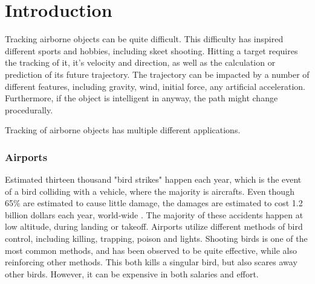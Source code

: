 
\chapter{Introduction}

Tracking airborne objects can be quite difficult.
This difficulty has inspired different sports and hobbies, including skeet shooting.
Hitting a target requires the tracking of it, it's velocity and direction, as well as the calculation or prediction of its future trajectory.
The trajectory can be impacted by a number of different features, including gravity, wind, initial force, any artificial acceleration.
Furthermore, if the object is intelligent in anyway, the path might change procedurally.


Tracking of airborne objects has multiple different applications.

\subsection{Airports}
Estimated thirteen thousand "bird strikes" happen each year, which is the event of a bird colliding with a vehicle, where the majority is aircrafts\cite{WikiBirdStrike}\cite{WildlifeStrikeReport}.
Even though 65\% are estimated to cause little damage, the damages are estimated to cost 1.2 billion dollars each year, world-wide \cite{CostOfBirdstrikes}.
The majority of these accidents happen at low altitude, during landing or takeoff\cite{CostOfBirdstrikes}.
Airports utilize different methods of bird control, including killing, trapping, poison and lights\cite{BirdControlAtAirports}.
Shooting birds is one of the most common methods, and has been observed to be quite effective, while also reinforcing other methods.
This both kills a singular bird, but also scares away other birds.
However, it can be expensive in both salaries and effort.

